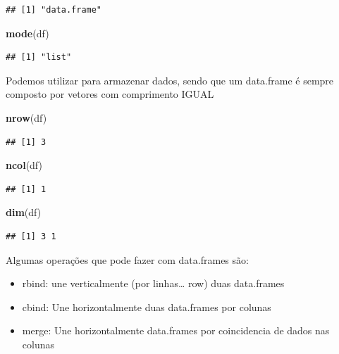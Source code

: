 \documentclass[]{book}
\newenvironment{Shaded}{\begin{snugshade}}{\end{snugshade}}
\newcommand{\KeywordTok}[1]{\textcolor[rgb]{0.13,0.29,0.53}{\textbf{#1}}}
\newcommand{\NormalTok}[1]{#1}
\providecommand{\tightlist}{%
  \setlength{\itemsep}{0pt}\setlength{\parskip}{0pt}}
\theoremstyle{definition}
\theoremstyle{definition}
\theoremstyle{definition}
\theoremstyle{remark}
\begin{document}
\begin{verbatim}
## [1] "data.frame"
\end{verbatim}

\begin{Shaded}
\begin{Highlighting}[]
\KeywordTok{mode}\NormalTok{(df)}
\end{Highlighting}
\end{Shaded}

\begin{verbatim}
## [1] "list"
\end{verbatim}

Podemos utilizar para armazenar dados, sendo que um data.frame é sempre
composto por vetores com comprimento IGUAL

\begin{Shaded}
\begin{Highlighting}[]
\KeywordTok{nrow}\NormalTok{(df)}
\end{Highlighting}
\end{Shaded}

\begin{verbatim}
## [1] 3
\end{verbatim}

\begin{Shaded}
\begin{Highlighting}[]
\KeywordTok{ncol}\NormalTok{(df)}
\end{Highlighting}
\end{Shaded}

\begin{verbatim}
## [1] 1
\end{verbatim}

\begin{Shaded}
\begin{Highlighting}[]
\KeywordTok{dim}\NormalTok{(df)}
\end{Highlighting}
\end{Shaded}

\begin{verbatim}
## [1] 3 1
\end{verbatim}

Algumas operações que pode fazer com data.frames são:

\begin{itemize}
\tightlist
\item
  rbind: une verticalmente (por linhas\ldots{} row) duas data.frames
\item
  cbind: Une horizontalmente duas data.frames por colunas
\item
  merge: Une horizontalmente data.frames por coincidencia de dados nas
  colunas
\end{itemize}
\end{document}
